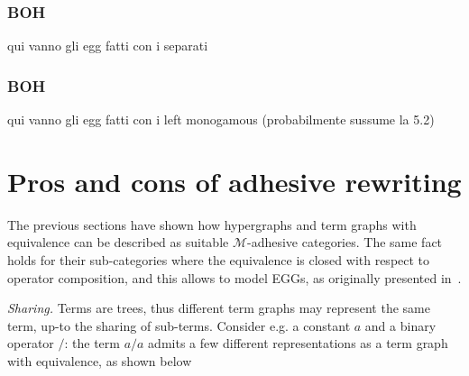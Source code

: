 \documentclass[3p]{elsarticle}
\theoremstyle{remark}
\theoremstyle{definition}
\begin{document}
\subsubsection{BOH}\label{sec:sepegg}

qui vanno gli egg fatti con i separati



\subsubsection{BOH}\label{sec:lmegg}

qui vanno gli egg fatti con i left monogamous (probabilmente sussume la 5.2)

\section{Pros and cons of adhesive rewriting}
\label{rewriting}
The previous sections have shown how hypergraphs and term graphs with equivalence
can be described as suitable $\mathcal{M}$-adhesive categories. 
The same fact holds for their sub-categories where the equivalence is
 closed with respect to operator composition, and this allows to
 model EGGs, as originally presented in~\cite{WillseyNWFTP21}. 

\emph{Sharing.} 
Terms are trees, thus different term graphs may represent the same term, up-to the sharing of sub-terms.
Consider e.g. a constant $a$ and a binary operator $/$: the term $a / a$ admits a few different 
representations as a term graph with equivalence, as shown below

%
\end{document}
